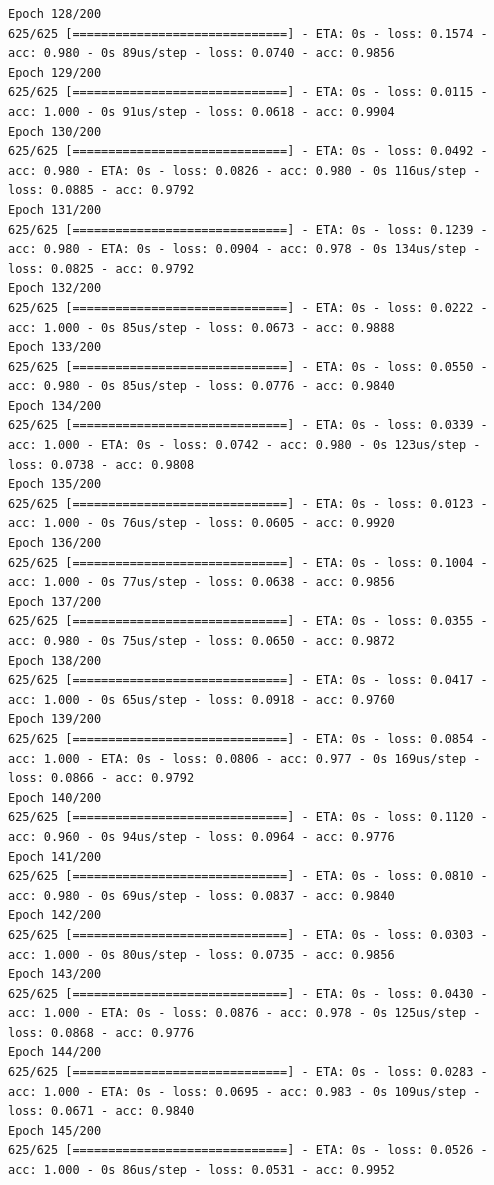 \documentclass[11pt]{article}
\begin{document}
\begin{Verbatim}[commandchars=\\\{\}]
Epoch 128/200
625/625 [==============================] - ETA: 0s - loss: 0.1574 - acc: 0.980 - 0s 89us/step - loss: 0.0740 - acc: 0.9856
Epoch 129/200
625/625 [==============================] - ETA: 0s - loss: 0.0115 - acc: 1.000 - 0s 91us/step - loss: 0.0618 - acc: 0.9904
Epoch 130/200
625/625 [==============================] - ETA: 0s - loss: 0.0492 - acc: 0.980 - ETA: 0s - loss: 0.0826 - acc: 0.980 - 0s 116us/step - loss: 0.0885 - acc: 0.9792
Epoch 131/200
625/625 [==============================] - ETA: 0s - loss: 0.1239 - acc: 0.980 - ETA: 0s - loss: 0.0904 - acc: 0.978 - 0s 134us/step - loss: 0.0825 - acc: 0.9792
Epoch 132/200
625/625 [==============================] - ETA: 0s - loss: 0.0222 - acc: 1.000 - 0s 85us/step - loss: 0.0673 - acc: 0.9888
Epoch 133/200
625/625 [==============================] - ETA: 0s - loss: 0.0550 - acc: 0.980 - 0s 85us/step - loss: 0.0776 - acc: 0.9840
Epoch 134/200
625/625 [==============================] - ETA: 0s - loss: 0.0339 - acc: 1.000 - ETA: 0s - loss: 0.0742 - acc: 0.980 - 0s 123us/step - loss: 0.0738 - acc: 0.9808
Epoch 135/200
625/625 [==============================] - ETA: 0s - loss: 0.0123 - acc: 1.000 - 0s 76us/step - loss: 0.0605 - acc: 0.9920
Epoch 136/200
625/625 [==============================] - ETA: 0s - loss: 0.1004 - acc: 1.000 - 0s 77us/step - loss: 0.0638 - acc: 0.9856
Epoch 137/200
625/625 [==============================] - ETA: 0s - loss: 0.0355 - acc: 0.980 - 0s 75us/step - loss: 0.0650 - acc: 0.9872
Epoch 138/200
625/625 [==============================] - ETA: 0s - loss: 0.0417 - acc: 1.000 - 0s 65us/step - loss: 0.0918 - acc: 0.9760
Epoch 139/200
625/625 [==============================] - ETA: 0s - loss: 0.0854 - acc: 1.000 - ETA: 0s - loss: 0.0806 - acc: 0.977 - 0s 169us/step - loss: 0.0866 - acc: 0.9792
Epoch 140/200
625/625 [==============================] - ETA: 0s - loss: 0.1120 - acc: 0.960 - 0s 94us/step - loss: 0.0964 - acc: 0.9776
Epoch 141/200
625/625 [==============================] - ETA: 0s - loss: 0.0810 - acc: 0.980 - 0s 69us/step - loss: 0.0837 - acc: 0.9840
Epoch 142/200
625/625 [==============================] - ETA: 0s - loss: 0.0303 - acc: 1.000 - 0s 80us/step - loss: 0.0735 - acc: 0.9856
Epoch 143/200
625/625 [==============================] - ETA: 0s - loss: 0.0430 - acc: 1.000 - ETA: 0s - loss: 0.0876 - acc: 0.978 - 0s 125us/step - loss: 0.0868 - acc: 0.9776
Epoch 144/200
625/625 [==============================] - ETA: 0s - loss: 0.0283 - acc: 1.000 - ETA: 0s - loss: 0.0695 - acc: 0.983 - 0s 109us/step - loss: 0.0671 - acc: 0.9840
Epoch 145/200
625/625 [==============================] - ETA: 0s - loss: 0.0526 - acc: 1.000 - 0s 86us/step - loss: 0.0531 - acc: 0.9952

\end{Verbatim}
\end{document}
